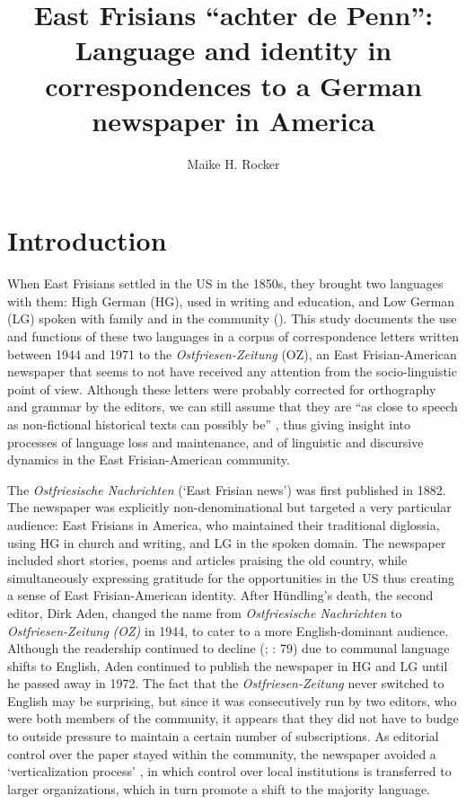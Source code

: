 \documentclass[output=paper]{langsci/langscibook}
\author{Maike H. Rocker\affiliation{The Pennsylvania State University}}
\title[East Frisians ``achter de Penn'']
      {East Frisians ``achter de Penn'': Language and identity in correspondences to a German newspaper in America}
\begin{document}
\maketitle 


\section{Introduction} %
\label{sec:rocker:1}

When East Frisians settled in the US in the 1850s, they brought two languages with them: High German (HG), used in writing and education, and Low German (LG) spoken with family and in the community (\citealt{Schnucker1917, Frizzel1992}). This study documents the use and functions of these two languages in a corpus of correspondence letters written between 1944 and 1971 to the \textit{Ostfriesen-Zeitung} (OZ), an East Frisian-American newspaper that seems to not have received any attention from the socio-linguistic point of view. Although these letters were probably corrected for orthography and grammar by the editors, we can still assume that they are “as close to speech as non-fictional historical texts can possibly be” \citep[156]{Elspass2012}, thus giving insight into processes of language loss and maintenance, and of linguistic and discursive dynamics in the East Frisian-American community.

The \textit{Ostfriesische Nachrichten} (‘East Frisian news’) was first published in 1882. The newspaper was explicitly non-denominational but targeted a very particular audience: East Frisians in America, who maintained their traditional diglossia, using HG in church and writing, and LG in the spoken domain. The newspaper included short stories, poems and articles praising the old country, while simultaneously expressing gratitude for the opportunities in the US thus creating a sense of East Frisian-American identity. After Hündling’s death, the second editor, Dirk Aden, changed the name from \textit{Ostfriesische Nachrichten} to \textit{Ostfriesen-Zeitung} \textit{(OZ)} in 1944, to cater to a more English-dominant audience. Although the readership continued to decline (\citealt{Monahan1971}; \citealt{Lindaman2004}: 79) due to communal language shifts to English, Aden continued to publish the newspaper in HG and LG until he passed away in 1972. The fact that the \textit{Ostfriesen-Zeitung} never switched to English may be surprising, but since it was consecutively run by two editors, who were both members of the community, it appears that they did not have to budge to outside pressure to maintain a certain number of subscriptions. As editorial control over the paper stayed within the community, the newspaper avoided a ‘verticalization process’ \citep{Salmons1983}, in which control over local institutions is transferred to larger organizations, which in turn promote a shift to the majority language. 
\end{document}
